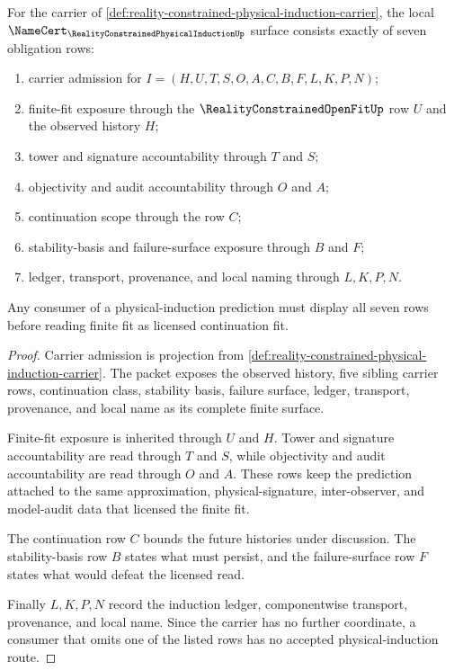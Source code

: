 \begin{theorem}
\label{thm:reality-constrained-physical-induction-namecert-obligations}
For the carrier of \autoref{def:reality-constrained-physical-induction-carrier}, the local $\NameCert_{\RealityConstrainedPhysicalInductionUp}$ surface consists exactly of seven obligation rows:
\begin{enumerate}
\item carrier admission for $I=(H,U,T,S,O,A,C,B,F,L,K,P,N)$;
\item finite-fit exposure through the $\RealityConstrainedOpenFitUp$ row $U$ and the observed history $H$;
\item tower and signature accountability through $T$ and $S$;
\item objectivity and audit accountability through $O$ and $A$;
\item continuation scope through the row $C$;
\item stability-basis and failure-surface exposure through $B$ and $F$;
\item ledger, transport, provenance, and local naming through $L,K,P,N$.
\end{enumerate}
Any consumer of a physical-induction prediction must display all seven rows before reading finite fit as licensed continuation fit.
\end{theorem}
\begin{proof}
Carrier admission is projection from \autoref{def:reality-constrained-physical-induction-carrier}. The packet exposes the observed history, five sibling carrier rows, continuation class, stability basis, failure surface, ledger, transport, provenance, and local name as its complete finite surface.

Finite-fit exposure is inherited through $U$ and $H$. Tower and signature accountability are read through $T$ and $S$, while objectivity and audit accountability are read through $O$ and $A$. These rows keep the prediction attached to the same approximation, physical-signature, inter-observer, and model-audit data that licensed the finite fit.

The continuation row $C$ bounds the future histories under discussion. The stability-basis row $B$ states what must persist, and the failure-surface row $F$ states what would defeat the licensed read.

Finally $L,K,P,N$ record the induction ledger, componentwise transport, provenance, and local name. Since the carrier has no further coordinate, a consumer that omits one of the listed rows has no accepted physical-induction route.
\end{proof}

